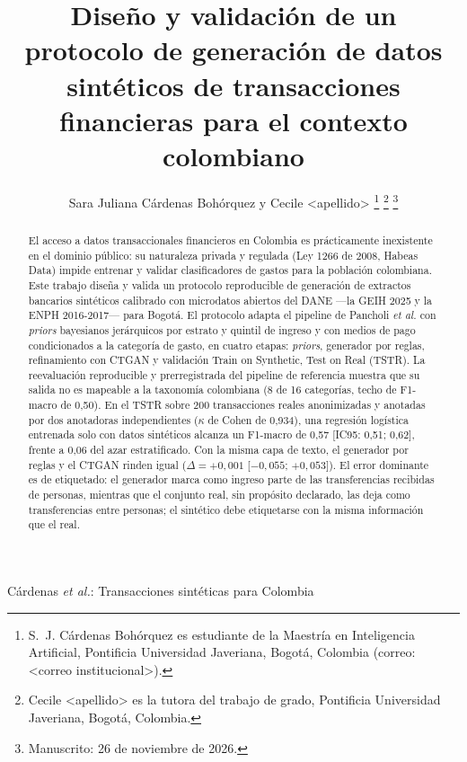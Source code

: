 \documentclass[journal]{IEEEtai}
\begin{document}
\title{Diseño y validación de un protocolo de generación de datos sintéticos de transacciones financieras para el contexto colombiano}

\author{Sara Juliana Cárdenas Bohórquez y Cecile <apellido>%
\thanks{S.~J. Cárdenas Bohórquez es estudiante de la Maestría en Inteligencia Artificial, Pontificia Universidad Javeriana, Bogotá, Colombia (correo: <correo institucional>).}%
\thanks{Cecile <apellido> es la tutora del trabajo de grado, Pontificia Universidad Javeriana, Bogotá, Colombia.}%
\thanks{Manuscrito: 26 de noviembre de 2026.}}

%
{Cárdenas \MakeLowercase{\textit{et al.}}: Transacciones sintéticas para Colombia}

\maketitle

\begin{abstract}
El acceso a datos transaccionales financieros en Colombia es prácticamente inexistente en el dominio público: su naturaleza privada y regulada (Ley 1266 de 2008, Habeas Data) impide entrenar y validar clasificadores de gastos para la población colombiana. Este trabajo diseña y valida un protocolo reproducible de generación de extractos bancarios sintéticos calibrado con microdatos abiertos del DANE —la GEIH 2025 y la ENPH 2016-2017— para Bogotá. El protocolo adapta el pipeline de Pancholi \textit{et al.} con \textit{priors} bayesianos jerárquicos por estrato y quintil de ingreso y con medios de pago condicionados a la categoría de gasto, en cuatro etapas: \textit{priors}, generador por reglas, refinamiento con CTGAN y validación Train on Synthetic, Test on Real (TSTR). La reevaluación reproducible y prerregistrada del pipeline de referencia muestra que su salida no es mapeable a la taxonomía colombiana (8 de 16 categorías, techo de F1-macro de 0{,}50). En el TSTR sobre 200 transacciones reales anonimizadas y anotadas por dos anotadoras independientes ($\kappa$ de Cohen de 0{,}934), una regresión logística entrenada solo con datos sintéticos alcanza un F1-macro de 0{,}57 [IC95: 0{,}51; 0{,}62], frente a 0{,}06 del azar estratificado. Con la misma capa de texto, el generador por reglas y el CTGAN rinden igual ($\Delta=+0{,}001$ [$-0{,}055$; $+0{,}053$]). El error dominante es de etiquetado: el generador marca como ingreso parte de las transferencias recibidas de personas, mientras que el conjunto real, sin propósito declarado, las deja como transferencias entre personas; el sintético debe etiquetarse con la misma información que el real.
\end{abstract}
\end{document}
